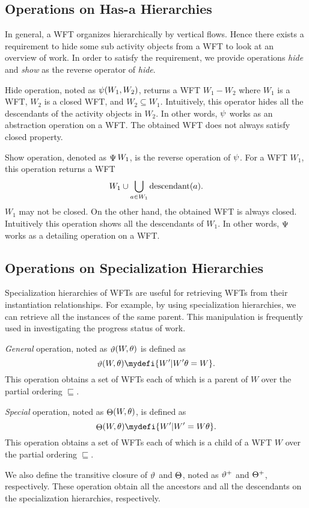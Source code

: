 \subsection{Operations on Has-a Hierarchies}

In general, a WFT organizes hierarchically by vertical flows.  Hence
there exists a requirement to hide some sub activity objects from a WFT to
look at an overview of work.  In order to satisfy the requirement, we
provide operations {\em hide} and {\em show} as the reverse operator of
{\em hide}.

Hide operation, noted as $\mathop{\psi}(W_1, W_2)$, returns a WFT $W_1 - W_2$
where $W_1$ is a WFT, $W_2$ is a closed WFT, and $W_2 \subseteq W_1$.
Intuitively, this operator hides all the descendants of the activity
objects in $W_2$.  In other words, $\mathop{\psi}$ works as an abstraction
operation on a WFT.  The obtained WFT does not always satisfy closed
property.

Show operation, denoted as $\mathop{\Psi} W_1$, is the reverse operation of
$\mathop{\psi}$.  For a WFT $W_1$, this operation returns a WFT
\[
 W_1 \cup \bigcup_{a \in W_1} \mathop{\rm descendant}\nolimits(a).
\]
$W_1$ may not be closed.  On the other hand, the obtained WFT is
always closed.
Intuitively this operation shows all the descendants of $W_1$.  In other 
words, $\mathop{\Psi}$ works as a detailing operation on a WFT.

\subsection{Operations on Specialization Hierarchies}

Specialization hierarchies of WFTs are useful for retrieving WFTs from
their instantiation relationships.  For example, by using specialization 
hierarchies, we can retrieve all the instances of the same parent.  This 
manipulation is frequently used in investigating the progress status of
work.

{\em General} operation, noted as $\mathop{\vartheta}(W, \theta)$ is defined as
\[
 \wfbgeneral (W, \theta) \mydefi \{W' | W'\theta = W\}.
\]
This operation obtains a set of WFTs each of which is a parent of $W$
over the partial ordering $\sqsubseteq$.

{\em Special} operation, noted as $\mathop{\Theta}(W, \theta)$, is defined as 
\[
 \wfbspecial(W, \theta) \mydefi \{W' | W' = W\theta\}.
\]
This operation obtains a set of WFTs each of which is a child of a WFT
$W$ over the partial ordering $\sqsubseteq$.

We also define the transitive closure of $\mathop{\vartheta}$ and
$\mathop{\Theta}$, noted as $\mathop{\vartheta^+}$ and $\mathop{\Theta^+}$,
respectively.  These operation obtain all the ancestors and all the
descendants on the specialization hierarchies, respectively.

